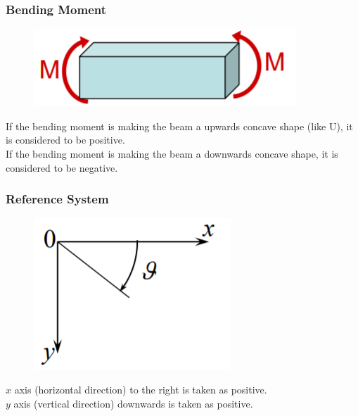 \documentclass[class=report, crop=false, 12pt,a4paper]{standalone}
\begin{document}
\subsubsection{Bending Moment}
\begin{figure}[H]
  \centering
  \includegraphics[width = 0.4 \textwidth]{../img/signconventionbendingmoment.PNG}
\end{figure}
If the bending moment is making the beam a upwards concave shape (like U), it is considered to be positive. \\
If the bending moment is making the beam a downwards concave shape, it is considered to be negative.
\subsubsection{Reference System}
\begin{figure}[H]
  \centering
  \includegraphics[width = 0.3 \textwidth]{../img/referencesystem.PNG}
\end{figure}
$x$ axis (horizontal direction) to the right is taken as positive. \\
$y$ axis (vertical direction) downwards is taken as positive.
\end{document}
